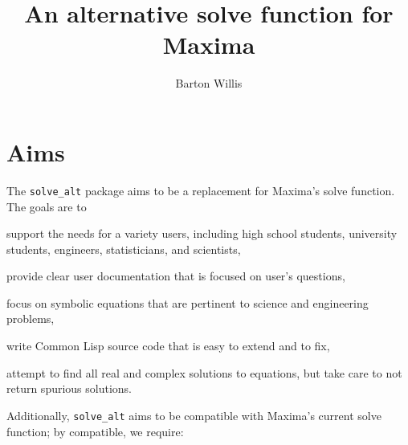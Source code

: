 \documentclass[]{scrartcl}
\title{An alternative solve function for Maxima}
\author{Barton Willis}
\newcommand{\altsolve}{\texttt{solve\_alt}}
\begin{document}
\maketitle

\section{Aims}

The \altsolve\/ package aims to be a replacement for Maxima's solve function. The goals are to

\begin{alphalist}[noitemsep]

\item support the needs for a variety users, including high school students, university students, engineers, statisticians, and scientists,

\item provide clear user documentation that is focused on user's questions,

\item focus on symbolic equations that are pertinent to science and engineering problems,

\item write Common Lisp source code that is easy to extend and to fix,

\item attempt to find all real and complex solutions to equations, but take care to not  return spurious solutions.

\end{alphalist}
Additionally, \altsolve\/  aims to be compatible with Maxima's current solve function; by compatible, we require:
\end{document}
